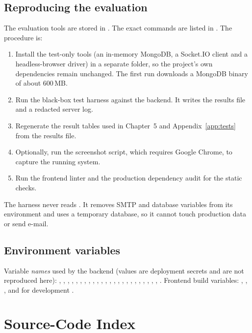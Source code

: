 \section*{Reproducing the evaluation}
The evaluation tools are stored in . The exact commands are listed in . The procedure is:
\begin{enumerate}
  \item Install the test-only tools (an in-memory MongoDB, a Socket.IO client and a headless-browser driver) in a separate folder, so the project's own dependencies remain unchanged. The first run downloads a MongoDB binary of about 600\,MB.
  \item Run the black-box test harness against the backend. It writes the results file and a redacted server log.
  \item Regenerate the result tables used in Chapter~5 and Appendix~\ref{app:tests} from the results file.
  \item Optionally, run the screenshot script, which requires Google Chrome, to capture the running system.
  \item Run the frontend linter and the production dependency audit for the static checks.
\end{enumerate}
The harness never reads . It removes SMTP and database variables from its environment and uses a temporary database, so it cannot touch production data or send e-mail.

\section*{Environment variables}
Variable \emph{names} used by the backend (values are deployment secrets and are not reproduced here): , , , , , , , , , , , , , , , , , , , , , , , , . Frontend build variables: , , , and for development .

\chapter{Source-Code Index}
\label{app:source}

